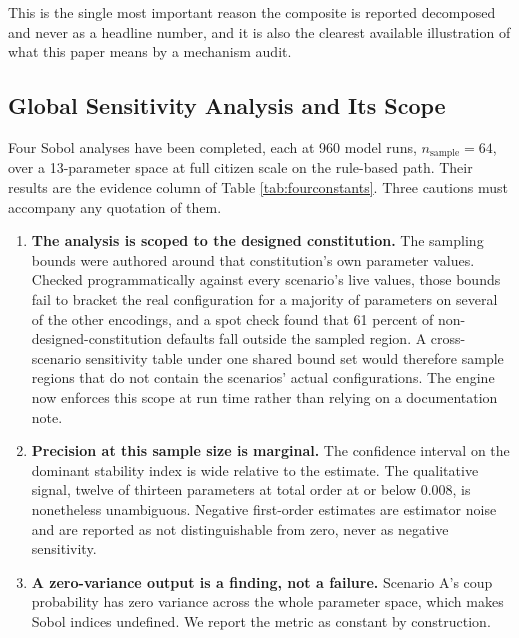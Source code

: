 \documentclass{ieeeaccess}
\newif\ifpendingvisible
\newcommand{\todo}[1]{%
  \ifpendingvisible\textcolor{red}{\textbf{[\MakeUppercase{#1}]}}\fi}
\begin{document}
This is the single most important reason the composite is reported
decomposed and never as a headline number, and it is also the clearest
available illustration of what this paper means by a mechanism audit.
\todo{PENDING CAMPAIGN: the seven-term decomposition table for all seven
scenarios at the campaign $N$.}

\subsection{Global Sensitivity Analysis and Its Scope}
\label{sec:gsa}
Four Sobol analyses have been completed, each at 960 model runs,
$n_{\mathrm{sample}}=64$, over a 13-parameter space at full citizen
scale on the rule-based path. Their results are the evidence column of
Table \ref{tab:fourconstants}. Three cautions must accompany any
quotation of them.

\begin{enumerate}
\item \textbf{The analysis is scoped to the designed constitution.}
The sampling bounds were authored around that constitution's own
parameter values. Checked programmatically against every scenario's live
values, those bounds fail to bracket the real configuration for a
majority of parameters on several of the other encodings, and a spot
check found that 61 percent of non-designed-constitution defaults fall
outside the sampled region. A cross-scenario sensitivity table under one
shared bound set would therefore sample regions that do not contain the
scenarios' actual configurations. The engine now enforces this scope at
run time rather than relying on a documentation note.
\item \textbf{Precision at this sample size is marginal.} The confidence
interval on the dominant stability index is wide relative to the
estimate. The qualitative signal, twelve of thirteen parameters at total
order at or below 0.008, is nonetheless unambiguous. Negative
first-order estimates are estimator noise and are reported as not
distinguishable from zero, never as negative sensitivity.
\item \textbf{A zero-variance output is a finding, not a failure.}
Scenario A's coup probability has zero variance across the whole
parameter space, which makes Sobol indices undefined. We report the
metric as constant by construction.
\end{enumerate}

\todo{PENDING: the two remaining sensitivity runs, a restricted-parameter
run on the Myanmar encoding for trust, and a \texttt{coup\_risk} run,
both of which are free to execute and are required before the
\texttt{coup\_risk} disclosure in Section \ref{sec:encoding} can be
quantified.}
\end{document}
